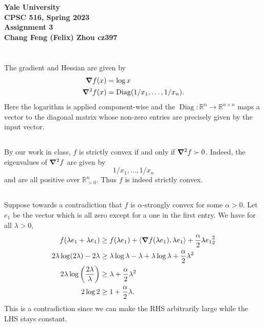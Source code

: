 \documentclass[10pt]{article}
\DeclarePairedDelimiter{\iprod}{\langle}{\rangle}
\let\norm\relax
\DeclarePairedDelimiter{\norm}{\lVert}{\rVert}
\DeclareMathOperator{\Diag}{Diag}
\newcommand{\R}{\mathbb{R}}
\begin{document}
\begin{center}
    {\Large\textbf{Yale University}}\\
    \vspace{3mm}
    {\Large\textbf{CPSC 516, Spring 2023}}\\
    \vspace{2mm}
    {\Large\textbf{Assignment 3}}\\
    \vspace{3mm}
    \textbf{Chang Feng (Felix) Zhou cz397}
\end{center}

\section{}
\subsection{}
The gradient and Hessian are given by
\begin{align*}
  \grad f(x)
  &= \log x \\
  \grad^2 f(x)
  &= \Diag(1/x_1, \dots, 1/x_n).
\end{align*}
Here the logarithm is applied component-wise
and the $\Diag: \R^n\to \R^{n\times n}$ maps a vector
to the diagonal matrix whose non-zero entries are precisely given by the input vector.

\subsection{}
By our work in class,
$f$ is strictly convex if and only if $\grad^2 f\succ 0$.
Indeed,
the eigenvalues of $\grad^2 f$ are given by
\[
  1/x_1, \dots, 1/x_n
\]
and are all positive over $\R_{>0}^n$.
Thus $f$ is indeed strictly convex.

\subsection{}
Suppose towards a contradiction that $f$ is $\alpha$-strongly convex for some $\alpha > 0$.
Let $e_1$ be the vector which is all zero except for a one in the first entry.
We have for all $\lambda > 0$,
\begin{align*}
  f(\lambda e_1 + \lambda e_1) &\geq f(\lambda e_1) + \iprod{\grad f(\lambda e_1), \lambda e_1} + \frac\alpha2 \norm{\lambda e_1}_2^2 \\
  2\lambda \log(2\lambda) - 2\lambda &\geq \lambda \log \lambda - \lambda + \lambda \log \lambda + \frac\alpha2 \lambda^2 \\
  2\lambda \log\left( \frac{2\lambda}\lambda \right) &\geq \lambda + \frac\alpha2 \lambda^2 \\
  2\log2 &\geq 1 + \frac\alpha2 \lambda.
\end{align*}
This is a contradiction since we can make the RHS arbitrarily large
while the LHS stays constant.
\end{document}
